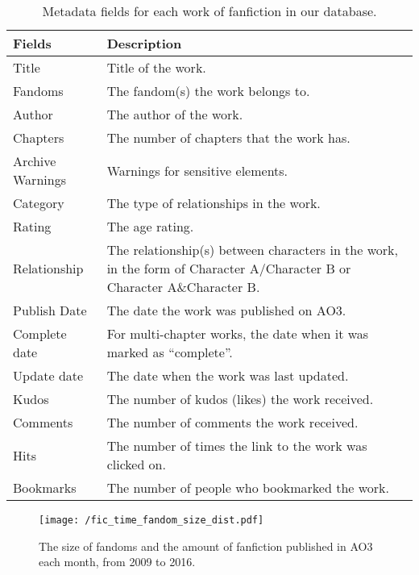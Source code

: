 \documentclass[letterpaper]{article} %
\begin{document}
\begin{table}
\centering
\begin{tabular}[width=0.9\textwidth]{p{3cm}p{5cm}}
\toprule
Fields & Description \\ 
   \hline

Title & Title of the work. \\
Fandoms & The fandom(s) the work belongs to. \\
Author & The author of the work.  \\
Chapters & The number of chapters that the work has. \\
Archive Warnings & Warnings for sensitive elements. \\
Category & The type of relationships in the work. \\
Rating & The age rating. \\
Relationship & The relationship(s) between characters in the work, in the form of Character A/Character B
or Character A\&Character B. \\
Publish Date & The date the work was published on AO3. \\
Complete date & For multi-chapter works, the date when it was marked as ``complete''.\\
Update date & The date when the work was last updated. \\
\hline

Kudos & The number of kudos (likes) the work received. \\
Comments & The number of comments the work received.\\
Hits & The number of times the link to the work was clicked on. \\
Bookmarks & The number of people who bookmarked the work.\\

\bottomrule
\end{tabular}
\caption{Metadata fields for each work of fanfiction in our database.}
\label{tab:metadata}
\end{table}%


\begin{figure*}
    \centering
        \texttt{[image: /fic\_time\_fandom\_size\_dist.pdf]}
        \caption{The size of fandoms and the amount of fanfiction published in AO3 each month, from 2009 to 2016.}
        \label{fig:fandom_size}    
    \end{figure*}
    
\end{document}
